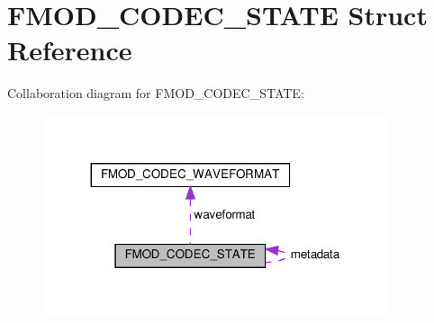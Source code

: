 \hypertarget{structFMOD__CODEC__STATE}{}\section{F\+M\+O\+D\+\_\+\+C\+O\+D\+E\+C\+\_\+\+S\+T\+A\+TE Struct Reference}
\label{structFMOD__CODEC__STATE}


Collaboration diagram for F\+M\+O\+D\+\_\+\+C\+O\+D\+E\+C\+\_\+\+S\+T\+A\+TE\+:
\nopagebreak
\begin{figure}[H]
\begin{center}
\leavevmode
\includegraphics[width=287pt]{structFMOD__CODEC__STATE__coll__graph}
\end{center}
\end{figure}
